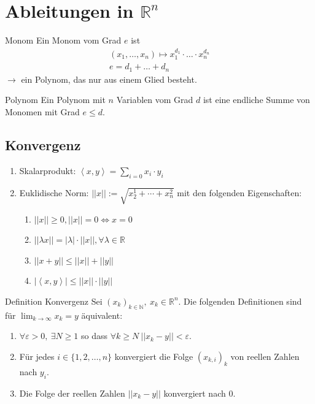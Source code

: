 \documentclass[a4paper,10pt]{article}
\def\R{\mathbb{R}}
\begin{document}
\section{Ableitungen in \texorpdfstring{$\R^n$}{Rⁿ}}
\begin{subbox}{Monom}
	Ein Monom vom Grad $e$ ist
	\begin{align*}
		(x_1, \ldots, x_n) \mapsto x_1^{d_1}\cdot \ldots \cdot x_n^{d_n} \\
		e = d_1 + \ldots + d_n                                           
	\end{align*}
	$\to$ ein Polynom, das nur aus einem Glied besteht.
\end{subbox}
\begin{mainbox}{Polynom}
	Ein Polynom mit $n$ Variablen vom Grad $d$ ist eine endliche Summe von Monomen mit Grad $e \le d$.
\end{mainbox}

\subsection{Konvergenz}
\begin{enumerate}
	\item Skalarprodukt: $\left< x,y\right> = \sum_{i=0} x_i \cdot y_i$
	\item Euklidische Norm: $||x|| := \sqrt{x_2^1 + \cdots + x_n^2}$ mit den folgenden Eigenschaften:
	      \begin{enumerate}
	      	\item $||x|| \ge 0, ||x|| = 0 \iff x = 0$
	      	\item $||\lambda x|| = |\lambda| \cdot ||x||, \forall \lambda \in \R$
	      	\item $||x+y|| \le ||x|| + ||y||$
	      	\item $|\left<x,y\right>| \le ||x|| \cdot ||y||$
	      \end{enumerate}
\end{enumerate}

\begin{mainbox}{Definition Konvergenz}
	Sei $(x_k)_{k \in \mathbb{N}},\ x_k \in \R^n$. Die folgenden Definitionen sind für $\lim_{k\to\infty}x_k = y$ äquivalent:
	\begin{enumerate}
		\item $\forall \varepsilon > 0,\ \exists N \ge 1$ so dass $\forall k \ge N \ ||x_k - y|| < \varepsilon$.
		\item Für jedes $i \in \{1,2,\dots, n\}$ konvergiert die Folge $(x_{k,i})_k$ von reellen Zahlen nach $y_i$.
		\item Die Folge der reellen Zahlen $||x_k - y||$ konvergiert nach $0$.
	\end{enumerate}
\end{mainbox}
\end{document}
